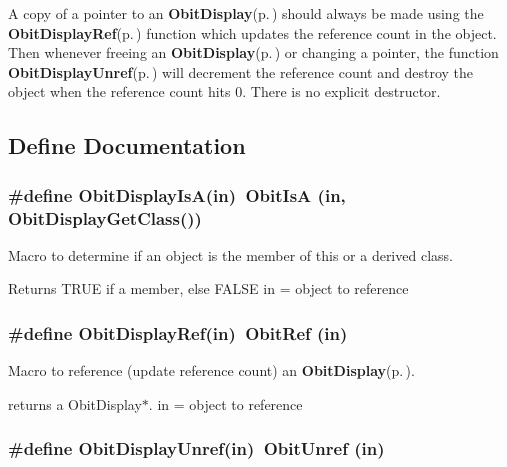 A copy of a pointer to an {\bf Obit\-Display}{\rm (p.\,\pageref{structObitDisplay})} should always be made using the {\bf Obit\-Display\-Ref}{\rm (p.\,\pageref{ObitDisplay_8h_a1})} function which updates the reference count in the object. Then whenever freeing an {\bf Obit\-Display}{\rm (p.\,\pageref{structObitDisplay})} or changing a pointer, the function {\bf Obit\-Display\-Unref}{\rm (p.\,\pageref{ObitDisplay_8h_a0})} will decrement the reference count and destroy the object when the reference count hits 0. There is no explicit destructor.

\subsection{Define Documentation}
\subsubsection{\setlength{\rightskip}{0pt plus 5cm}\#define Obit\-Display\-Is\-A(in)\ Obit\-Is\-A (in, Obit\-Display\-Get\-Class())}\label{ObitDisplay_8h_a2}


Macro to determine if an object is the member of this or a derived class. 

Returns TRUE if a member, else FALSE in = object to reference 
\subsubsection{\setlength{\rightskip}{0pt plus 5cm}\#define Obit\-Display\-Ref(in)\ Obit\-Ref (in)}\label{ObitDisplay_8h_a1}


Macro to reference (update reference count) an {\bf Obit\-Display}{\rm (p.\,\pageref{structObitDisplay})}. 

returns a Obit\-Display$\ast$. in = object to reference 
\subsubsection{\setlength{\rightskip}{0pt plus 5cm}\#define Obit\-Display\-Unref(in)\ Obit\-Unref (in)}\label{ObitDisplay_8h_a0}



